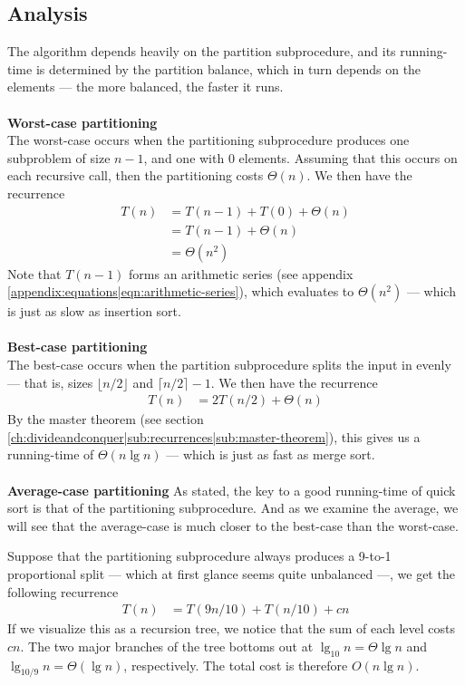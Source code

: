 \subsection{Analysis}
The algorithm depends heavily on the partition subprocedure, and its
running-time is determined by the partition balance, which in turn depends on
the elements --- the more balanced, the faster it runs.
\\\\
\noindent \textbf{Worst-case partitioning} \\
The worst-case occurs when the partitioning subprocedure produces one
subproblem of size $n - 1$, and one with $0$ elements. Assuming that this
occurs on each recursive call, then the partitioning costs $\Theta(n)$. We
then have the recurrence
\begin{align}
	T(n) &= T(n-1) + T(0) + \Theta(n) \\ &= T(n-1) + \Theta(n) \\ &= \Theta(n^2)
\end{align}
Note that $T(n-1)$ forms an arithmetic series (see appendix
\ref{appendix:equations|eqn:arithmetic-series}), which evaluates to
$\Theta(n^2)$ --- which is just as slow as insertion sort.
\\\\
\noindent \textbf{Best-case partitioning} \\
The best-case occurs when the partition subprocedure splits the input in
evenly --- that is, sizes $\lfloor n/2 \rfloor$ and $\lceil n/2 \rceil - 1$.
We then have the recurrence
\begin{align}
	T(n) &= 2T(n/2) + \Theta(n)
\end{align}
By the master theorem (see section
\ref{ch:divideandconquer|sub:recurrences|sub:master-theorem}), this gives us a
running-time of $\Theta(n \lg n)$ --- which is just as fast as merge sort.
\\\\
\noindent \textbf{Average-case partitioning}
As stated, the key to a good running-time of quick sort is that of the
partitioning subprocedure. And as we examine the average, we will see that the
average-case is much closer to the best-case than the worst-case.

Suppose that the partitioning subprocedure always produces a 9-to-1
proportional split --- which at first glance seems quite unbalanced ---, we
get the following recurrence
\begin{align}
	T(n) &= T(9n/10) + T(n/10) + cn
\end{align}
If we visualize this as a recursion tree, we notice that the sum of each level
costs $cn$. The two major branches of the tree bottoms out at $\lg_{10}n =
\Theta{\lg n}$ and $\lg_{10/9}n = \Theta(\lg n)$, respectively. The total cost
is therefore $O(n \lg n)$.

